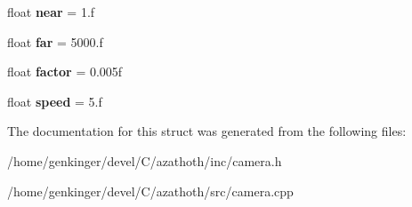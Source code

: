 \begin{DoxyCompactItemize}
\item 
\mbox{\label{structCamera_ad96efd3e1e4ec33dddb1d25f05d02ff2}} 
float {\bfseries near} = 1.f
\item 
\mbox{\label{structCamera_a9f30b77edf6485e001a98d21ff5f17fe}} 
float {\bfseries far} = 5000.f
\item 
\mbox{\label{structCamera_a5c9e3aadcdb71da95aaa1610fbeaa343}} 
float {\bfseries factor} = 0.\+005f
\item 
\mbox{\label{structCamera_a2960f533df18fe6d7d574c316c6d217a}} 
float {\bfseries speed} = 5.f
\end{DoxyCompactItemize}


The documentation for this struct was generated from the following files\+:\begin{DoxyCompactItemize}
\item 
/home/genkinger/devel/\+C/azathoth/inc/camera.\+h\item 
/home/genkinger/devel/\+C/azathoth/src/camera.\+cpp\end{DoxyCompactItemize}
